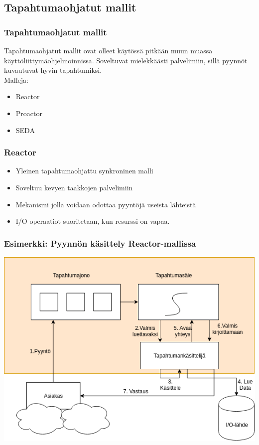\documentclass{beamer}
\begin{document}
\subsection{Tapahtumaohjatut mallit}
\begin{frame}
  \frametitle{Tapahtumaohjatut mallit}
  Tapahtumaohjatut mallit ovat olleet käytössä pitkään
  muun muassa käyttöliittymäohjelmoinnissa.
  Soveltuvat mielekkäästi palvelimiin, sillä
  pyynnöt kuvautuvat hyvin tapahtumiksi.\\
  Malleja:
  \begin{itemize}
    \item Reactor
    \item Proactor
    \item SEDA
  \end{itemize}
\end{frame}
\begin{frame}
  \frametitle{Reactor}
  \begin{itemize}
    \item Yleinen tapahtumaohjattu synkroninen malli
    \item Soveltuu kevyen taakkojen palvelimiin
    \item Mekanismi jolla voidaan odottaa pyyntöjä useista lähteistä
    \item I/O-operaatiot suoritetaan, kun resurssi on vapaa.
  \end{itemize}
\end{frame}
\begin{frame}
  \frametitle{Esimerkki: Pyynnön käsittely Reactor-mallissa}
  \includegraphics[scale=0.5]{reactor.png}
\end{frame}
\end{document}
